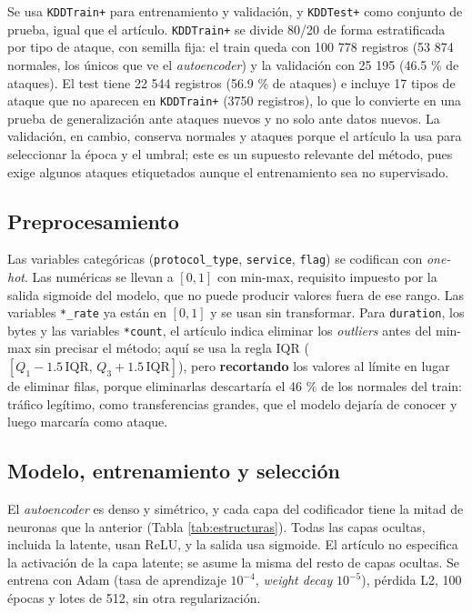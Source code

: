 \documentclass[
  spanish,
  11pt,
]{article}
\begin{document}
Se usa \texttt{KDDTrain+} para entrenamiento y validación, y \texttt{KDDTest+} como conjunto de prueba, igual que
el artículo. \texttt{KDDTrain+} se divide 80/20 de forma estratificada por tipo de ataque, con semilla fija:
el train queda con 100 778 registros (53 874 normales, los únicos que ve el \emph{autoencoder}) y la
validación con 25 195 (46.5 \% de ataques). El test tiene 22 544 registros (56.9 \% de ataques) e
incluye 17 tipos de ataque que no aparecen en \texttt{KDDTrain+} (3750 registros), lo que lo convierte en una
prueba de generalización ante ataques nuevos y no solo ante datos nuevos. La validación, en cambio,
conserva normales y ataques porque el artículo la usa para seleccionar la época y el umbral; este es
un supuesto relevante del método, pues exige algunos ataques etiquetados aunque el entrenamiento sea
no supervisado.

\subsection{Preprocesamiento}\label{sec:preprocesamiento}

Las variables categóricas (\texttt{protocol\_type}, \texttt{service}, \texttt{flag}) se codifican con \emph{one-hot}. Las
numéricas se llevan a \([0, 1]\) con min-max, requisito impuesto por la salida sigmoide del modelo, que
no puede producir valores fuera de ese rango. Las variables \texttt{*\_rate} ya están en \([0, 1]\) y se usan sin
transformar. Para \texttt{duration}, los bytes y las variables \texttt{*count}, el artículo indica eliminar los
\emph{outliers} antes del min-max sin precisar el método; aquí se usa la regla IQR
(\([Q_1 - 1.5\,\mathrm{IQR},\, Q_3 + 1.5\,\mathrm{IQR}]\)), pero \textbf{recortando} los valores al límite en
lugar de eliminar filas, porque eliminarlas descartaría el 46 \% de los normales del train: tráfico
legítimo, como transferencias grandes, que el modelo dejaría de conocer y luego marcaría como ataque.

\subsection{Modelo, entrenamiento y selección}\label{sec:modelo}

El \emph{autoencoder} es denso y simétrico, y cada capa del codificador tiene la mitad de neuronas que la
anterior (Tabla \ref{tab:estructuras}). Todas las capas ocultas, incluida la latente, usan ReLU, y la
salida usa sigmoide. El artículo no especifica la activación de la capa latente; se asume la misma
del resto de capas ocultas. Se entrena con Adam (tasa de aprendizaje \(10^{-4}\), \emph{weight decay}
\(10^{-5}\)), pérdida L2, 100 épocas y lotes de 512, sin otra regularización.
\end{document}

